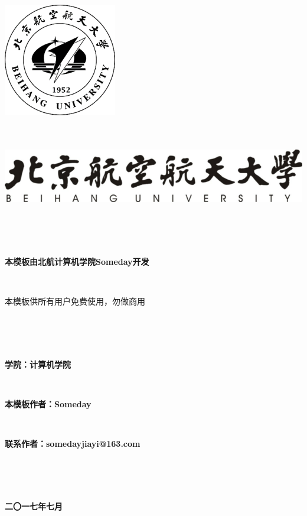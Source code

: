\documentclass{ctexart}
\newcommand{\erhao}{\fontsize{21pt}\selectfont}
\newcommand{\sanhao}{\fontsize{15.75pt}\selectfont}
\newcommand{\sihao}{\fontsize{14pt}\selectfont}
\begin{document}
\lhead{}%
\rhead{}%


\setcounter{secnumdepth}{0}%





\includegraphics[scale=1]{include_picture/xiaohui.png}
\ \\ 
\ \\
\ \\
\begin{center}
\includegraphics[scale=1]{include_picture/xiaoming.png}
\end{center}
\ \\
\ \\
\ \\
\erhao
\centerline{\textbf{本模板由北航计算机学院Someday开发}} %
\ \\
\centerline{本模板供所有用户免费使用，勿做商用}
\ \\
\ \\
\ \\
\sihao
\centerline{\textbf{学院：计算机学院}}
\ \\
\centerline{\textbf{本模板作者：Someday}}
\ \\
\centerline{\textbf{联系作者：somedayjiayi@163.com}}
\ \\
\ \\ 
\ \\
\sanhao
\centerline{\textbf{二〇一七年七月}}
\end{document}

